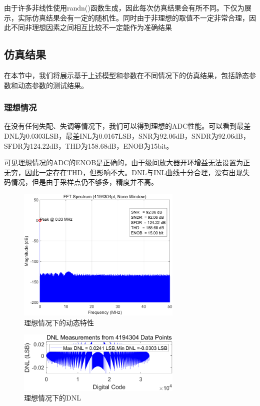 \documentclass[cs4size,a4paper]{ctexart}
\numberwithin{equation}{section}
\numberwithin{table}{section}
\numberwithin{figure}{section}
\begin{document}
	由于许多非线性使用randn()函数生成，因此每次仿真结果会有所不同。下仅为展示，实际仿真结果会有一定的随机性。同时由于非理想的取值不一定非常合理，因此不同非理想因素之间相互比较不一定能作为准确结果

	\subsection{仿真结果}
	在本节中，我们将展示基于上述模型和参数在不同情况下的仿真结果，包括静态参数和动态参数的测试结果。
	\subsubsection{理想情况}
	在没有任何失配、失调等情况下，我们可以得到理想的ADC性能。可以看到最差DNL为0.0303LSB，最差INL为0.0167LSB，SNR为92.06dB，SNDR为92.06dB，SFDR为124.22dB，THD为158.68dB，ENOB为15bit。

	可见理想情况的ADC的ENOB是正确的，由于级间放大器开环增益无法设置为正无穷，因此一定存在THD，但影响不大。DNL与INL曲线十分合理，没有出现失码情况，但是由于采样点仍不够多，精度并不高。
		\begin{figure}[H]
			\centering
			\includegraphics[width=0.7\textwidth]{pic/ideal/DFT.png}
			\caption{理想情况下的动态特性} 
		\end{figure}

		\begin{figure}[H]
			\centering
			\includegraphics[width=0.7\textwidth]{pic/ideal/DNL.png}
			\caption{理想情况下的DNL} 
		\end{figure}
\end{document}
